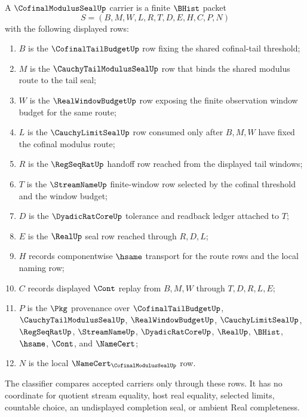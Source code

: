 \begin{definition}
\label{def:cofinal-modulus-seal-carrier}
A $\CofinalModulusSealUp$ carrier is a finite $\BHist$ packet
$$
S=(B,M,W,L,R,T,D,E,H,C,P,N)
$$
with the following displayed rows:
\begin{enumerate}
\item $B$ is the $\CofinalTailBudgetUp$ row fixing the shared cofinal-tail threshold;
\item $M$ is the $\CauchyTailModulusSealUp$ row that binds the shared modulus route to the tail seal;
\item $W$ is the $\RealWindowBudgetUp$ row exposing the finite observation window budget for the same route;
\item $L$ is the $\CauchyLimitSealUp$ row consumed only after $B,M,W$ have fixed the cofinal modulus route;
\item $R$ is the $\RegSeqRatUp$ handoff row reached from the displayed tail windows;
\item $T$ is the $\StreamNameUp$ finite-window row selected by the cofinal threshold and the window budget;
\item $D$ is the $\DyadicRatCoreUp$ tolerance and readback ledger attached to $T$;
\item $E$ is the $\RealUp$ seal row reached through $R,D,L$;
\item $H$ records componentwise $\hsame$ transport for the route rows and the local naming row;
\item $C$ records displayed $\Cont$ replay from $B,M,W$ through $T,D,R,L,E$;
\item $P$ is the $\Pkg$ provenance over $\CofinalTailBudgetUp$, $\CauchyTailModulusSealUp$, $\RealWindowBudgetUp$, $\CauchyLimitSealUp$, $\RegSeqRatUp$, $\StreamNameUp$, $\DyadicRatCoreUp$, $\RealUp$, $\BHist$, $\hsame$, $\Cont$, and $\NameCert$;
\item $N$ is the local $\NameCert_{\CofinalModulusSealUp}$ row.
\end{enumerate}
The classifier compares accepted carriers only through these rows. It has no coordinate for quotient stream equality, host real equality, selected limits, countable choice, an undisplayed completion seal, or ambient Real completeness.
\end{definition}

